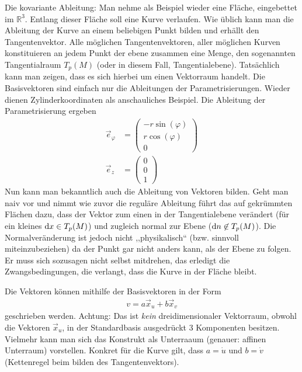 \documentclass{scrartcl}
\begin{document}
		\begin{paragraph}{Die kovariante Ableitung:}
			Man nehme als Beispiel wieder eine Fläche, eingebettet im $\mathbb{R}^3$. Entlang dieser Fläche soll eine Kurve verlaufen. Wie üblich 
			kann man die Ableitung der Kurve an einem beliebigen Punkt bilden und erhällt den Tangentenvektor. Alle möglichen Tangentenvektoren,
			aller möglichen Kurven konstituieren an jedem Punkt der ebene zusammen eine Menge, den sogenannten Tangentialraum $T_p(M)$
			(oder in diesem Fall, Tangentialebene). Tatsächlich kann man zeigen, dass es sich hierbei um einen Vektorraum handelt. Die Basisvektoren
			sind einfach nur die Ableitungen der Parametrisierungen. Wieder dienen Zylinderkoordinaten als anschauliches Beispiel. 
			Die Ableitung der Parametrisierung ergeben
			\begin{align*}
				\vec{e}_\varphi&=\left(\begin{array}{c} -r\sin(\varphi)\\ r\cos(\varphi)\\ 0\end{array}\right)\\
				\vec{e}_z&=\left(\begin{array}{c} 0\\0\\1\end{array}\right)
			\end{align*}
			Nun kann man bekanntlich auch die Ableitung von Vektoren bilden. Geht man naiv vor und nimmt wie zuvor die reguläre Ableitung 
			führt das auf gekrümmten Flächen dazu, dass der Vektor zum einen in der Tangentialebene verändert (für ein kleines ${\rm d}x\in T_p(M)$)
			und zugleich normal zur Ebene (${\rm d}n\not \in T_p(M)$). Die Normalveränderung ist jedoch nicht ,,physikalisch`` (bzw. sinnvoll miteinzubeziehen)
			da der Punkt gar nicht anders kann, als der Ebene zu folgen. Er muss sich sozusagen nicht selbst mitdrehen, das erledigt die Zwangsbedingungen,
			die verlangt, dass die Kurve in der Fläche bleibt.
			
			Die Vektoren können mithilfe der Basisvektoren in der Form
			\begin{align}
				v=a\vec{x}_u+b\vec{x}_v
			\end{align}
			geschrieben werden. Achtung: Das ist \textit{kein} dreidimensionaler Vektorraum, obwohl die Vektoren $\vec{x}_u$, in der Standardbasis ausgedrückt 3 Komponenten
			besitzen. Vielmehr kann man sich das Konstrukt als Unterraaum (genauer: affinen Unterraum) vorstellen. Konkret für die Kurve gilt, dass $a=\dot{u}$ und
			$b=\dot{v}$ (Kettenregel beim bilden des Tangentenvektors).
			

\end{paragraph}
\end{document}
